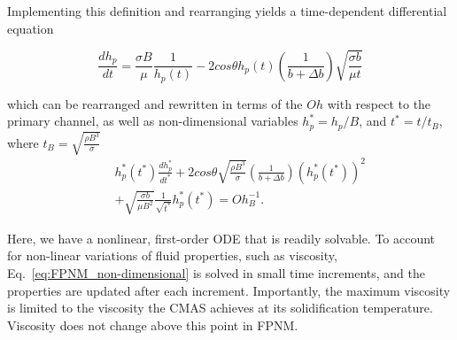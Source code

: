 \documentclass[%
 aip,
 amsmath,amssymb,
 reprint,%
]{revtex4-1}
\begin{document}
\noindent Implementing this definition and rearranging yields a time-dependent differential equation

\begin{equation}
    \frac{dh_{p}}{dt} = \frac{\sigma B}{\mu} \frac{1}{h_{p}(t)} - 2 cos\theta h_{p}(t) \left( \frac{1}{b+\Delta b} \right) \sqrt{\frac{\sigma b}{\mu t}}
    \label{eq:FPNM_dimensional}
\end{equation}

\noindent which can be rearranged and rewritten in terms of the $Oh$ with respect to the primary channel, as well as non-dimensional variables $h_p^* = h_p/B$, and $t^* = t/t_{B}$, where $t_{B} = \sqrt{\frac{\rho B^{3}}{\sigma}}$
\begin{eqnarray}
\label{eq:FPNM_non-dimensional}
    &&h_{p}^{*}\left(t^{*}\right)\frac{dh_{p}^{*}}{dt^{*}} + 2 cos\theta \sqrt{\frac{\rho B^{3}}{\sigma}} \left( \frac{1}{b+\Delta b} \right)\left(h_{p}^{*}\left(t^{*}\right)\right)^{2} \\
    && + \sqrt{\frac{\sigma b}{\mu B^{2}}} \frac{1}{\sqrt{t^{*}}} h_{p}^{*} \left(t^{*}\right) = Oh_{B}^{-1}. \nonumber
\end{eqnarray}



\noindent Here, we have a nonlinear, first-order ODE that is readily solvable. To account for non-linear variations of fluid properties, such as viscosity, Eq.~\ref{eq:FPNM_non-dimensional} is solved in small time increments, and the properties are updated after each increment. Importantly, the maximum viscosity is limited to the viscosity the CMAS achieves at its solidification temperature. Viscosity does not change above this point in FPNM.

\end{document}
